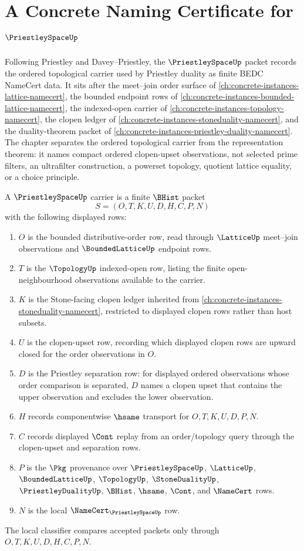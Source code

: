 \chapter{A Concrete Naming Certificate for $\PriestleySpaceUp$}
\label{ch:concrete-instances-priestley-space-namecert}

Following Priestley and Davey--Priestley, the $\PriestleySpaceUp$ packet records the ordered topological carrier used by Priestley duality as finite BEDC NameCert data. It sits after the meet--join order surface of \autoref{ch:concrete-instances-lattice-namecert}, the bounded endpoint rows of \autoref{ch:concrete-instances-bounded-lattice-namecert}, the indexed-open carrier of \autoref{ch:concrete-instances-topology-namecert}, the clopen ledger of \autoref{ch:concrete-instances-stoneduality-namecert}, and the duality-theorem packet of \autoref{ch:concrete-instances-priestley-duality-namecert}. The chapter separates the ordered topological carrier from the representation theorem: it names compact ordered clopen-upset observations, not selected prime filters, an ultrafilter construction, a powerset topology, quotient lattice equality, or a choice principle.

\begin{definition}
\label{def:priestley-space-carrier}
A $\PriestleySpaceUp$ carrier is a finite $\BHist$ packet
$$
S=(O,T,K,U,D,H,C,P,N)
$$
with the following displayed rows:
\begin{enumerate}
\item $O$ is the bounded distributive-order row, read through $\LatticeUp$ meet--join observations and $\BoundedLatticeUp$ endpoint rows.
\item $T$ is the $\TopologyUp$ indexed-open row, listing the finite open-neighbourhood observations available to the carrier.
\item $K$ is the Stone-facing clopen ledger inherited from \autoref{ch:concrete-instances-stoneduality-namecert}, restricted to displayed clopen rows rather than host subsets.
\item $U$ is the clopen-upset row, recording which displayed clopen rows are upward closed for the order observations in $O$.
\item $D$ is the Priestley separation row: for displayed ordered observations whose order comparison is separated, $D$ names a clopen upset that contains the upper observation and excludes the lower observation.
\item $H$ records componentwise $\hsame$ transport for $O,T,K,U,D,P,N$.
\item $C$ records displayed $\Cont$ replay from an order/topology query through the clopen-upset and separation rows.
\item $P$ is the $\Pkg$ provenance over $\PriestleySpaceUp$, $\LatticeUp$, $\BoundedLatticeUp$, $\TopologyUp$, $\StoneDualityUp$, $\PriestleyDualityUp$, $\BHist$, $\hsame$, $\Cont$, and $\NameCert$ rows.
\item $N$ is the local $\NameCert_{\PriestleySpaceUp}$ row.
\end{enumerate}
The local classifier compares accepted packets only through $O,T,K,U,D,H,C,P,N$.
\end{definition}

